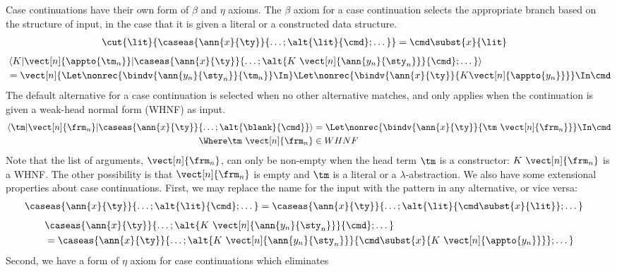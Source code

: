 \documentclass{article}
\begin{document}
Case continuations have their own form of $\beta$ and $\eta$ axioms.  The
$\beta$ axiom for a case continuation selects the appropriate branch based on
the structure of input, in the case that it is given a literal or a constructed
data structure.
\begin{align*}
  \cut{\lit}{\caseas{\ann{x}{\ty}}{\dots;\alt{\lit}{\cmd};\dots}}
  &=
  \cmd\subst{x}{\lit}
\end{align*}
\begin{align*}
  &
  \braket
  { K
  | 
    \vect[n]{\appto{\tm_n}}
  | \caseas{\ann{x}{\ty}}{
      \dots; \alt{K ~ \vect[n]{\ann{y_n}{\sty_n}}}{\cmd}; \dots
    } }
  \\
  &=
  \vect[n]{
  \Let
    \nonrec{\bindv{\ann{y_n}{\sty_n}}{\tm_n}}
  \In
  }
  \Let \nonrec{
    \bindv{\ann{x}{\ty}}{K \vect[n]{\appto{y_n}}}
  } \In
    \cmd
\end{align*}
The default alternative for a case continuation is selected when no other
alternative matches, and only applies when the continuation is given a weak-head
normal form (WHNF) as input.
\begin{align*}
  \braket
  { \tm
  | \vect[n]{\frm_n}
  | \caseas{\ann{x}{\ty}}{\dots;\alt{\blank}{\cmd}} }
  &=
  \Let
    \nonrec{\bindv{\ann{x}{\ty}}{\tm ~ \vect[n]{\frm_n}}}
  \In
    \cmd
  \\
  \Where
  \tm ~ \vect[n]{\frm_n}
  &\in
  WHNF
\end{align*}
Note that the list of arguments, $\vect[n]{\frm_n}$, can only be non-empty when
the head term $\tm$ is a constructor: $K ~ \vect[n]{\frm_n}$ is a WHNF.  The
other possibility is that $\vect[n]{\frm_n}$ is empty and $\tm$ is a literal or
a $\lambda$-abstraction.  We also have some extensional properties about case
continuations.  First, we may replace the name for the input with the pattern in
any alternative, or vice versa:
\begin{align*}
  \caseas{\ann{x}{\ty}}{\dots;\alt{\lit}{\cmd};\dots}
  &=
  \caseas{\ann{x}{\ty}}{\dots;\alt{\lit}{\cmd\subst{x}{\lit}};\dots}
\end{align*}
\begin{align*}
  &
  \caseas{\ann{x}{\ty}}{\dots;\alt{K ~ \vect[n]{\ann{y_n}{\sty_n}}}{\cmd};\dots}
  \\
  &=
  \caseas{\ann{x}{\ty}}{
    \dots;
    \alt
    {K ~ \vect[n]{\ann{y_n}{\sty_n}}}
    {\cmd\subst{x}{K ~ \vect[n]{\appto{y_n}}}};
    \dots
    }
\end{align*}
Second, we have a form of $\eta$ axiom for case continuations which eliminates
\end{document}
